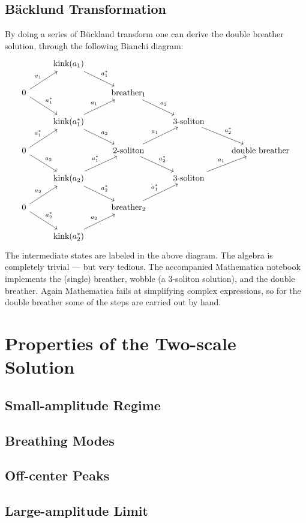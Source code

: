 \documentclass{report}
\begin{document}
\section{B\"acklund Transformation}
By doing a series of B\"uckland transform one can derive the double breather solution, through the following Bianchi diagram:
\[
\begin{tikzcd}
  & \text{kink}(a_1) \arrow{dr}{a_1^*} &&\\
 0 \arrow{ur}{a_1} \arrow{dr}{a_1^*} & &\text{breather}_1\arrow{dr}{a_2}&\\
  & \text{kink}(a_1^*) \arrow{ur}{a_1} \arrow{dr}{a_2} && \text{3-soliton}\arrow{dr}{a_2^*}&\\
 0 \arrow{ur}{a_1^*} \arrow{dr}{a_2} &&\text{2-soliton}\arrow{ur}{a_1}\arrow{dr}{a_2^*}&&\text{double breather}\\
 &\text{kink}(a_2)\arrow{ur}{a_1^*}\arrow{dr}{a_2^*}&&\text{3-soliton}\arrow{ur}{a_1}\\
 0\arrow{ur}{a_2}\arrow{dr}{a_2^*}&&\text{breather}_2\arrow{ur}{a_1^*}\\
 &\text{kink}(a_2^*)\arrow{ur}{a_2}&&
\end{tikzcd}
\]
The intermediate states are labeled in the above diagram. The algebra is completely trivial --- but very tedious. The accompanied Mathematica notebook implements the (single) breather, wobble (a 3-soliton solution), and the double breather. Again Mathematica fails at simplifying complex expressions, so for the double breather some of the steps are carried out by hand.

\chapter{Properties of the Two-scale Solution}
\section{Small-amplitude Regime}
\section{Breathing Modes}
\section{Off-center Peaks}
\section{Large-amplitude Limit}
\end{document}
